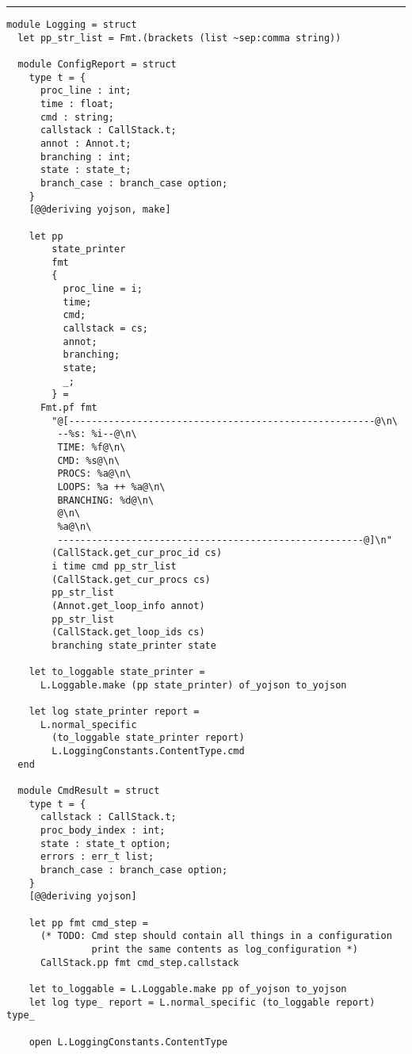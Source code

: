 \vspace{2em}
\noindent\rule{\textwidth}{0.5pt}
\vspace{-0.6cm}
\begin{verbatim}
module Logging = struct
  let pp_str_list = Fmt.(brackets (list ~sep:comma string))

  module ConfigReport = struct
    type t = {
      proc_line : int;
      time : float;
      cmd : string;
      callstack : CallStack.t;
      annot : Annot.t;
      branching : int;
      state : state_t;
      branch_case : branch_case option;
    }
    [@@deriving yojson, make]

    let pp
        state_printer
        fmt
        {
          proc_line = i;
          time;
          cmd;
          callstack = cs;
          annot;
          branching;
          state;
          _;
        } =
      Fmt.pf fmt
        "@[------------------------------------------------------@\n\
         --%s: %i--@\n\
         TIME: %f@\n\
         CMD: %s@\n\
         PROCS: %a@\n\
         LOOPS: %a ++ %a@\n\
         BRANCHING: %d@\n\
         @\n\
         %a@\n\
         ------------------------------------------------------@]\n"
        (CallStack.get_cur_proc_id cs)
        i time cmd pp_str_list
        (CallStack.get_cur_procs cs)
        pp_str_list
        (Annot.get_loop_info annot)
        pp_str_list
        (CallStack.get_loop_ids cs)
        branching state_printer state

    let to_loggable state_printer =
      L.Loggable.make (pp state_printer) of_yojson to_yojson

    let log state_printer report =
      L.normal_specific
        (to_loggable state_printer report)
        L.LoggingConstants.ContentType.cmd
  end

  module CmdResult = struct
    type t = {
      callstack : CallStack.t;
      proc_body_index : int;
      state : state_t option;
      errors : err_t list;
      branch_case : branch_case option;
    }
    [@@deriving yojson]

    let pp fmt cmd_step =
      (* TODO: Cmd step should contain all things in a configuration
               print the same contents as log_configuration *)
      CallStack.pp fmt cmd_step.callstack

    let to_loggable = L.Loggable.make pp of_yojson to_yojson
    let log type_ report = L.normal_specific (to_loggable report) type_

    open L.LoggingConstants.ContentType


\end{verbatim}
